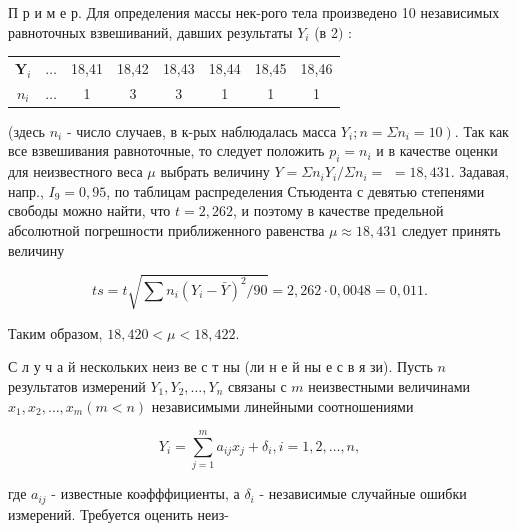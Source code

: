 \documentclass[10pt]{article}
\begin{document}
П р и м е р. Для определения массы нек-рого тела произведено 10 независимых равноточных взвешиваний, давших результаты $Y_{i}$ (в 2$)$ :



\begin{center}

\begin{tabular}{cc|c|c|c|c|c|c}

\hline

$\boldsymbol{Y}_{i}$ & $\ldots$ & 18,41 & 18,42 & 18,43 & 18,44 & 18,45 & 18,46 \\

$n_{i}$ & $\ldots$ & 1 & 3 & 3 & 1 & 1 & 1 \\

\hline

\end{tabular}

\end{center}



(здесь $n_{i}$ - число случаев, в к-рых наблюдалась масса $\left.Y_{i} ; n=\Sigma n_{i}=10\right)$. Так как все взвешивания равноточные, то следует положить $p_{i}=n_{i}$ и в качестве оценки для неизвестного веса $\mu$ выбрать величину $Y=\Sigma n_{i} Y_{i} / \Sigma n_{i}=$ $=18,431$. Задавая, напр., $I_{9}=0,95$, по таблицам распределения Стьюдента с девятью степенями свободы можно найти, что $t=2,262$, и поэтому в качестве предельной абсолютной погрешности приближенного равенства $\mu \approx 18,431$ следует принять величину



\[

t s=t \sqrt{\sum n_{i}\left(Y_{i}-\bar{Y}\right)^{2} / 90}=2,262 \cdot 0,0048=0,011 .

\]



Таким образом, $18,420<\mu<18,422$.



С л у ч а й нескольких неиз ве с т ны (ли н е й ны е с в я зи). Пусть $n$ результатов измерений $Y_{1}, Y_{2}, \ldots, Y_{n}$ связаны с $m$ неизвестными величинами $x_{1}, x_{2}, \ldots, x_{m}(m<n)$ независимыми линейными соотношениями



\[

Y_{i}=\sum_{j=1}^{m} a_{i j} x_{j}+\delta_{i}, i=1,2, \ldots, n,

\]



где $a_{i j}$ - известные коәфффициенты, а $\delta_{i}$ - независимые случайные ошибки измерений. Требуется оценить неиз-
\end{document}
